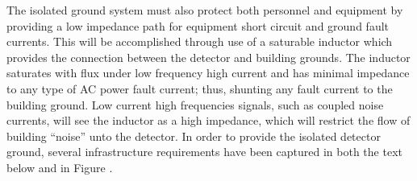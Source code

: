 The isolated ground system must also protect both personnel and equipment by providing a low impedance path for equipment short circuit and ground fault currents.  This will be accomplished through use of a saturable inductor which provides the connection between the detector and building grounds.  The inductor saturates with flux under low frequency high current and has minimal impedance to any type of AC power fault current; thus, shunting any fault current to the building ground.  Low current high frequencies signals, such as coupled noise currents, will see the inductor as a high impedance, which will restrict the flow of building “noise” unto the detector.
In order to provide the isolated detector ground, several infrastructure requirements have been captured in both the text below and in Figure . 

